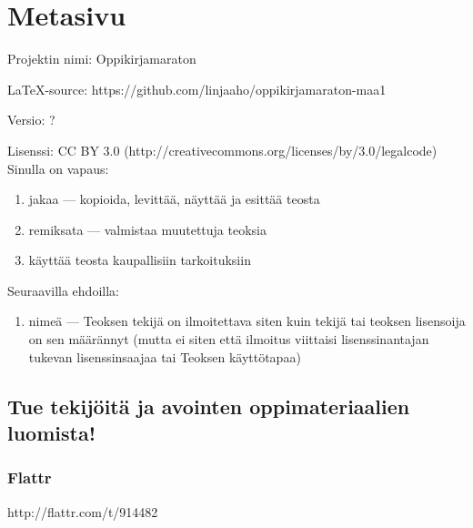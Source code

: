 \newpage

\section*{Metasivu}


Projektin nimi: Oppikirjamaraton

LaTeX-source: https://github.com/linjaaho/oppikirjamaraton-maa1

Versio: ?

Lisenssi: CC BY 3.0 (http://creativecommons.org/licenses/by/3.0/legalcode)\\
Sinulla on vapaus:
\begin{enumerate}
\item jakaa — kopioida, levittää, näyttää ja esittää teosta
\item remiksata — valmistaa muutettuja teoksia
\item käyttää teosta kaupallisiin tarkoituksiin
\end{enumerate}
Seuraavilla ehdoilla:
\begin{enumerate}
\item nimeä — Teoksen tekijä on ilmoitettava siten kuin tekijä tai teoksen lisensoija on sen määrännyt (mutta ei siten että ilmoitus viittaisi lisenssinantajan tukevan lisenssinsaajaa tai Teoksen käyttötapaa)
\end{enumerate}

\subsection*{Tue tekijöitä ja avointen oppimateriaalien luomista!}

\subsubsection*{Flattr}

http://flattr.com/t/914482

